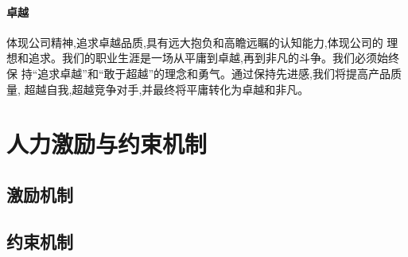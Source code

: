 \paragraph{卓越}
体现公司精神,追求卓越品质,具有远大抱负和高瞻远瞩的认知能力,体现公司的
理想和追求。我们的职业生涯是一场从平庸到卓越,再到非凡的斗争。我们必须始终保
持“追求卓越”和“敢于超越”的理念和勇气。通过保持先进感,我们将提高产品质量,
超越自我,超越竞争对手,并最终将平庸转化为卓越和非凡。

\section{人力激励与约束机制}
\subsection{激励机制}

\subsection{约束机制}

